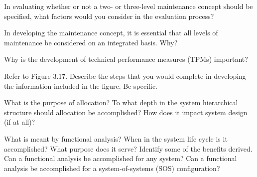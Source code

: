 \begin{exercises}
    \begin{exercise}
    \label{sea-3-13}
        In evaluating whether or not a two- or three-level maintenance concept should be specified, what factors would you consider in the evaluation process?
    \end{exercise}
    \begin{solution}
    \end{solution}
    
    \begin{exercise}
    \label{sea-3-14}
        In developing the maintenance concept, it is essential that all levels of maintenance be considered on an integrated basis. Why?
    \end{exercise}
    \begin{solution}
    \end{solution}
    
    \begin{exercise}
    \label{sea-3-15}
        Why is the development of technical performance measures (TPMs) important?
    \end{exercise}
    \begin{solution}
    \end{solution}
    
    \begin{exercise}
    \label{sea-3-16}
        Refer to Figure 3.17. Describe the steps that you would complete in developing the information included in the figure. Be specific.
    \end{exercise}
    \begin{solution}
    \end{solution}
    
    \begin{exercise}
    \label{sea-3-17}
        What is the purpose of allocation? To what depth in the system hierarchical structure should allocation be accomplished? How does it impact system design (if at all)?
    \end{exercise}
    \begin{solution}
    \end{solution}
    
    \begin{exercise}
    \label{sea-3-18}
        What is meant by functional analysis? When in the system life cycle is it accomplished? What purpose does it serve? Identify some of the benefits derived. Can a functional analysis be accomplished for any system? Can a functional analysis be accomplished for a system-of-systems (SOS) configuration?
    \end{exercise}
    \begin{solution}
    \end{solution}
    

\end{exercises}
